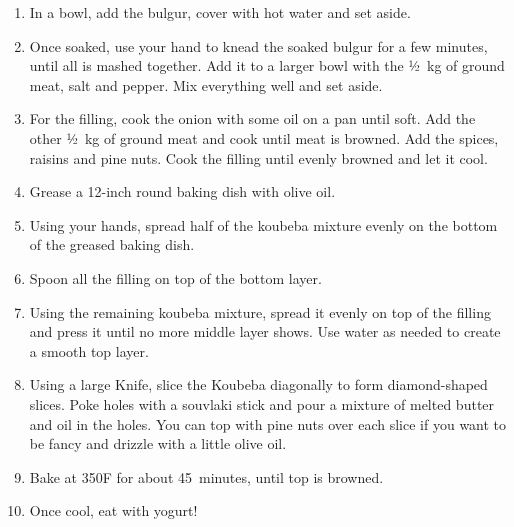 \begin{enumerate}
    \item In a bowl, add the bulgur, cover with hot water and set aside.
    \item Once soaked, use your hand to knead the soaked bulgur for a few minutes, until all is mashed together. Add it to a larger bowl with the ½~kg of ground meat, salt and pepper. Mix everything well and set aside.
    \item For the filling, cook the onion with some oil on a pan until soft. Add the other ½~kg of ground meat and cook until meat is browned. Add the spices, raisins and pine nuts. Cook the filling until evenly browned and let it cool.
    \item Grease a 12-inch round baking dish with olive oil.
    \item Using your hands, spread half of the koubeba mixture evenly on the bottom of the greased baking dish.
    \item Spoon all the filling on top of the bottom layer.
    \item Using the remaining koubeba mixture, spread it evenly on top of the filling and press it until no more middle layer shows. Use water as needed to create a smooth top layer.
    \item Using a large Knife, slice the Koubeba diagonally to form diamond-shaped slices. Poke holes with a souvlaki stick and pour a mixture of melted butter and oil in the holes. You can top with pine nuts over each slice if you want to be fancy and drizzle with a little olive oil.
    \item Bake at 350\degree F for about 45~minutes, until top is browned.
    \item Once cool, eat with yogurt!
\end{enumerate}
